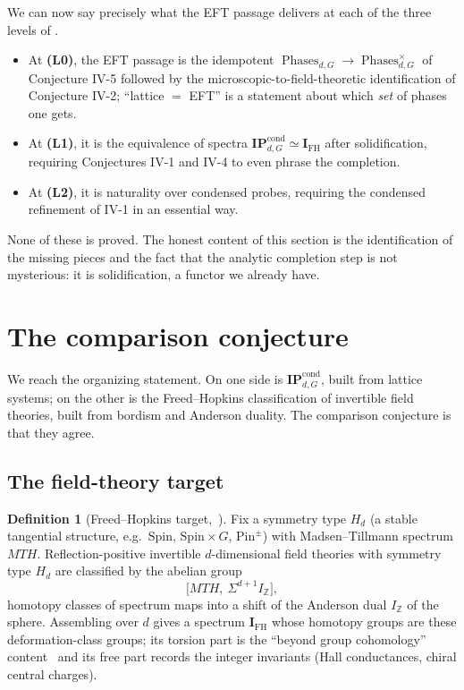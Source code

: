 \documentclass[12pt]{article}
\newcommand{\Phases}{\operatorname{Phases}}    %
\newcommand{\IPcond}{\mathbf{IP}^{\mathrm{cond}}}  %
\newcommand{\IZ}{I_{\mathbb{Z}}}             %
\newcommand{\IFH}{\mathbf{I}_{\mathrm{FH}}}  %
\newcommand{\MTH}{\mathit{MTH}}
\theoremstyle{definition}
\newtheorem{definition}[definition]{Definition}
\theoremstyle{remark}
\theoremstyle{plain}
\begin{document}
We can now say precisely what the EFT passage delivers at each of the three
levels of .
\begin{itemize}
\item At \textbf{(L0)}, the EFT passage is the idempotent
  $\Phases_{d,G}\to\Phases_{d,G}^{\times}$ of Conjecture IV-5 followed by the
  microscopic-to-field-theoretic identification of Conjecture IV-2; ``lattice
  $=$ EFT'' is a statement about which \emph{set} of phases one gets.
\item At \textbf{(L1)}, it is the equivalence of spectra $\IPcond_{d,G}\simeq
  \IFH$ after solidification, requiring Conjectures IV-1 and IV-4 to even phrase
  the completion.
\item At \textbf{(L2)}, it is naturality over condensed probes, requiring the
  condensed refinement of IV-1 in an essential way.
\end{itemize}
None of these is proved. The honest content of this section is the
identification of the missing pieces and the fact that the analytic completion
step is not mysterious: it is solidification, a functor we already have.

\section{The comparison conjecture}
\label{sec:comparison}

We reach the organizing statement. On one side is $\IPcond_{d,G}$, built from
lattice systems; on the other is the Freed--Hopkins classification of invertible
field theories, built from bordism and Anderson duality. The comparison
conjecture is that they agree.

\subsection{The field-theory target}

\begin{definition}[Freed--Hopkins target,~\cite{freed-hopkins}]
\label{def:fh}
Fix a symmetry type $H_d$ (a stable tangential structure, e.g.\ $\mathrm{Spin}$,
$\mathrm{Spin}\times G$, $\mathrm{Pin}^\pm$) with Madsen--Tillmann spectrum
$\MTH$. Reflection-positive invertible $d$-dimensional field theories with
symmetry type $H_d$ are classified by the abelian group
\[
  \bigl[\MTH,\ \Sigma^{d+1}\IZ\bigr],
\]
homotopy classes of spectrum maps into a shift of the Anderson dual $\IZ$ of the
sphere. Assembling over $d$ gives a spectrum $\IFH$ whose homotopy groups are
these deformation-class groups; its torsion part is the ``beyond group
cohomology'' content~\cite{kapustin-cobordism} and its free part records the
integer invariants (Hall conductances, chiral central charges).
\end{definition}
\end{document}
